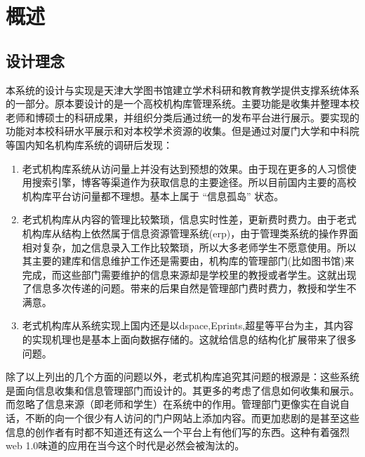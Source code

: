 
\chapter{概述}
\label{chap:intro}

\section{设计理念}
\label{sec:dongji}

本系统的设计与实现是天津大学图书馆建立学术科研和教育教学提供支撑系统体系的一部分。原本要设计的是一个高校机构库管理系统。主要功能是收集并整理本校老师和博硕士的科研成果，并组织分类后通过统一的发布平台进行展示。要实现的功能对本校科研水平展示和对本校学术资源的收集。但是通过对厦门大学和中科院等国内知名机构库系统的调研后发现：
\begin{enumerate}
\item 老式机构库系统从访问量上并没有达到预想的效果。由于现在更多的人习惯使用搜索引擎，博客等渠道作为获取信息的主要途径。所以目前国内主要的高校机构库平台访问量都不理想。基本上属于 “信息孤岛” 状态。
\item 老式机构库从内容的管理比较繁琐，信息实时性差，更新费时费力。由于老式机构库从结构上依然属于信息资源管理系统(erp)，由于管理类系统的操作界面相对复杂，加之信息录入工作比较繁琐，所以大多老师学生不愿意使用。所以其主要的建库和信息维护工作还是需要由，机构库的管理部门(比如图书馆)来完成，而这些部门需要维护的信息来源却是学校里的教授或者学生。这就出现了信息多次传递的问题。带来的后果自然是管理部门费时费力，教授和学生不满意。
\item 老式机构库从系统实现上国内还是以dspace,Eprints,超星等平台为主，其内容的实现机理也是基本上面向数据存储的。这就给信息的结构化扩展带来了很多问题。
\end{enumerate}
除了以上列出的几个方面的问题以外，老式机构库追究其问题的根源是：这些系统是面向信息收集和信息管理部门而设计的。其更多的考虑了信息如何收集和展示。而忽略了信息来源（即老师和学生）在系统中的作用。管理部门更像实在自说自话，不断的向一个很少有人访问的门户网站上添加内容。而更加悲剧的是甚至这些信息的创作者有时都不知道还有这么一个平台上有他们写的东西。这种有着强烈web 1.0味道的应用在当今这个时代是必然会被淘汰的。

